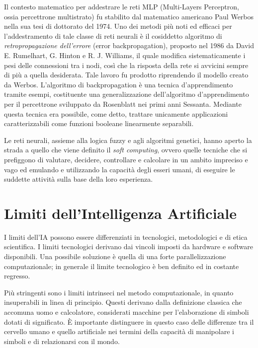 Il contesto matematico per addestrare le reti MLP (Multi-Layers Perceptron, ossia percettrone multistrato) fu stabilito dal matematico americano Paul Werbos nella sua tesi di dottorato del 1974. Uno dei metodi più noti ed efficaci per l'addestramento di tale classe di reti neurali è il cosiddetto algoritmo di \emph{retropropagazione dell'errore} (error backpropagation), proposto nel 1986 da David E. Rumelhart, G. Hinton e R. J. Williams, il quale modifica sistematicamente i pesi delle connessioni tra i nodi, così che la risposta della rete si avvicini sempre di più a quella desiderata. Tale lavoro fu prodotto riprendendo il modello creato da Werbos. L'algoritmo di backpropagation è una tecnica d'apprendimento tramite esempi, costituente una generalizzazione dell'algoritmo d'apprendimento per il percettrone sviluppato da Rosenblatt nei primi anni Sessanta. Mediante questa tecnica era possibile, come detto, trattare unicamente applicazioni caratterizzabili come funzioni booleane linearmente separabili.

Le reti neurali, assieme alla logica fuzzy e agli algoritmi genetici, hanno aperto la strada a quello che viene definito il \emph{soft computing}, ovvero quelle tecniche che si prefiggono di valutare, decidere, controllare e calcolare in un ambito impreciso e vago ed emulando e utilizzando la capacità degli esseri umani, di eseguire le suddette attività sulla base della loro esperienza.

\section{Limiti dell'Intelligenza Artificiale}
I limiti dell’IA possono essere differenziati in tecnologici, metodologici e di etica scientifica. I limiti tecnologici derivano dai vincoli imposti da hardware e software disponibili. Una possibile soluzione è quella di una forte parallelizzazione computazionale; in generale il limite tecnologico è ben definito ed in costante regresso.

Più stringenti sono i limiti intrinseci nel metodo computazionale, in quanto insuperabili in linea di principio. Questi derivano dalla definizione classica che accomuna uomo e calcolatore, considerati macchine per l’elaborazione di simboli dotati di significato. È importante distinguere in questo caso delle differenze tra il cervello umano e quello artificiale nei termini della capacità di manipolare i simboli e di relazionarsi con il mondo.


